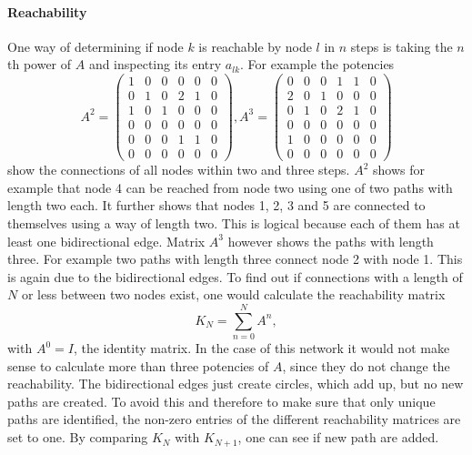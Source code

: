 \paragraph{Reachability}
One way of determining if node $k$ is reachable by node $l$ in $n$ steps is taking the $n$th power of $A$ and inspecting its entry $a_{lk}$. For example the potencies 
\begin{equation}
A^2 = \left( \begin{matrix}
 1 & 0 & 0 & 0 & 0 & 0\\
 0 & 1 & 0 & 2 & 1 & 0\\
 1 & 0 & 1 & 0 & 0 & 0\\
 0 & 0 & 0 & 0 & 0 & 0\\
 0 & 0 & 0 & 1 & 1 & 0\\
 0 & 0 & 0 & 0 & 0 & 0
 \end{matrix}
 \right),
 A^3 = \left( \begin{matrix}
 0 & 0 & 0 & 1 & 1 & 0\\
 2 & 0 & 1 & 0 & 0 & 0\\
 0 & 1 & 0 & 2 & 1 & 0\\
 0 & 0 & 0 & 0 & 0 & 0\\
 1 & 0 & 0 & 0 & 0 & 0\\
 0 & 0 & 0 & 0 & 0 & 0
 \end{matrix}
 \right) 
  \label{eq:adjMatExampPot}
\end{equation}
show the connections of all nodes within two and three steps. $A^2$ shows for example 
that node 4 can be reached from node two using one of two paths with length two each. It further shows that nodes 1, 2, 3 and 5 are connected to themselves using a way of length two. This is logical because each of them has at least one bidirectional edge.
Matrix $A^3$ however shows the paths with length three. For example two paths with length three connect node 2 with node 1. This is again due to the bidirectional edges.
To find out if connections with a length of $N$ or less between two nodes exist, one would calculate the reachability matrix
\begin{equation}
K_N = \sum_{n=0}^N A^n, \label{eq:reachability}
\end{equation}
with $A^0 = I$, the identity matrix. In the case of this network it would not make sense to calculate more than three potencies of $A$, since they do not change the reachability. The bidirectional edges just create circles, which add up, but no new paths are created. To avoid this and therefore to make sure that only unique paths are identified, the non-zero entries of the different reachability matrices are set to one. By comparing $K_N$ with $K_{N+1}$, one can see if new path are added. 

